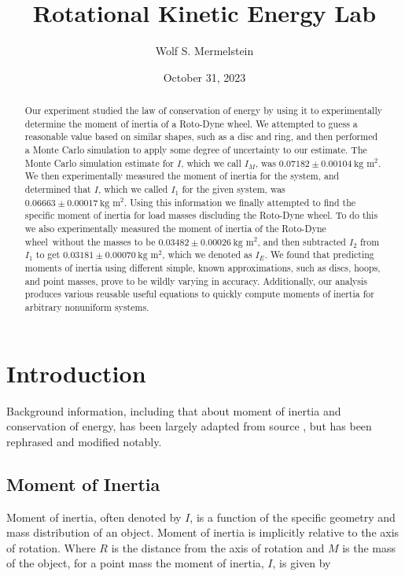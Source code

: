 \documentclass[coverpage]{article}
\title{Rotational Kinetic Energy Lab}
\date{October 31, 2023}
\author{Wolf S. Mermelstein}
\affil{Department of Physics, Case Western Reserve University, Cleveland, Ohio, 44106-7079}
\newcommand{\iUnit}{\text{kg $\text{m}^2$}}
\newcommand{\rwheel}{Roto-Dyne wheel}
\begin{document}
	
	
	\maketitle
	
	\begin{abstract}
		Our experiment studied the law of conservation of energy by using it to experimentally determine the moment of inertia of a \rwheel. We attempted to guess a reasonable value based on similar shapes, such as a disc and ring, and then performed a Monte Carlo simulation to apply some degree of uncertainty to our estimate. The Monte Carlo simulation estimate for $I$, which we call $I_M$, was $0.07182 \pm 0.00104\ \iUnit$. We then experimentally measured the moment of inertia for the system, and determined that $I$, which we called $I_1$ for the given system, was $0.06663 \pm 0.00017\ \iUnit$. Using this information we finally attempted to find the specific moment of inertia for load masses discluding the \rwheel. To do this we also experimentally measured the moment of inertia of the \rwheel~without the masses to be $0.03482 \pm 0.00026\ \iUnit$, and then subtracted $I_2$ from $I_1$ to get $0.03181 \pm 0.00070\ \iUnit$, which we denoted as $I_E$. We found that predicting moments of inertia using different simple, known approximations, such as discs, hoops, and point masses, prove to be wildly varying in accuracy. Additionally, our analysis produces various reusable useful equations to quickly compute moments of inertia for arbitrary nonuniform systems.
	\end{abstract}
	
	\tableofcontents
	
	\twocolumn
	
	\section{Introduction}
	
	Background information, including that about moment of inertia and conservation of energy, has been largely adapted from source \cite{labManual}, but has been rephrased and modified notably.
	
	\subsection{Moment of Inertia}
	
	Moment of inertia, often denoted by $I$, is a function of the specific geometry and mass distribution of an object. Moment of inertia is implicitly relative to the axis of rotation. Where $R$ is the distance from the axis of rotation and $M$ is the mass of the object, for a point mass the moment of inertia, $I$, is given by
	
\end{document}

